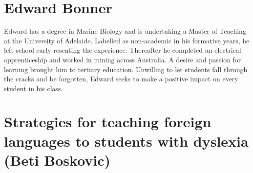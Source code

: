 \documentclass[twoside,14pt,a4paper,notitlepage]{memoir}
\begin{document}
\section*{Edward Bonner}

Edward has a degree in Marine Biology and is undertaking a Master of Teaching at the University of Adelaide. Labelled as non-academic in his formative years, he left school early resenting the experience. Thereafter he completed an electrical apprenticeship and worked in mining across Australia. A desire and passion for learning brought him to tertiary education. Unwilling to let students fall through the cracks and be forgotten, Edward seeks to make a positive impact on every student in his class.



\section*{Strategies for teaching foreign languages to students with dyslexia (Beti Boskovic)}
\label{aut:boskovic}
\end{document}
